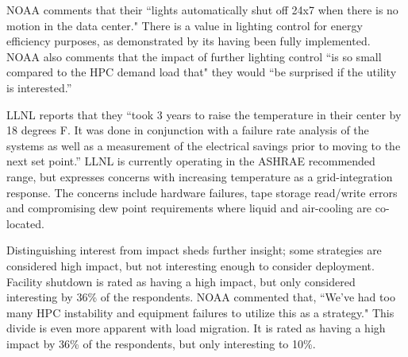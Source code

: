 NOAA comments that their ``lights automatically shut off 24x7 
when there is no motion in the data center." There is a value in lighting control for 
energy efficiency purposes, as demonstrated by its having been fully implemented. NOAA also comments that
the impact of further lighting control ``is so small compared to the HPC demand load that" they would ``be surprised 
if the utility is interested.''

LLNL reports that they ``took 3 years to raise the temperature in their center by 18 degrees F. It was done in conjunction with a failure rate analysis of the systems as well as a measurement of the electrical savings prior to moving to the next set point.'' LLNL is currently operating in the ASHRAE 
recommended range, but expresses concerns with increasing temperature as a grid-integration response. The 
concerns include hardware failures, 
tape storage read/write errors and compromising dew point requirements where liquid and air-cooling are co-located.

Distinguishing interest from impact sheds further insight; some strategies are 
considered high impact, but not interesting enough to consider deployment. Facility
shutdown is rated as having a high impact, but only
considered interesting by 36\% of the respondents. NOAA commented that, ``We've had too many HPC
instability and equipment failures to utilize this as a strategy." This divide is even more
apparent with load migration. It is rated as having a high impact by 36\% of the
respondents, but only interesting to 10\%. 
